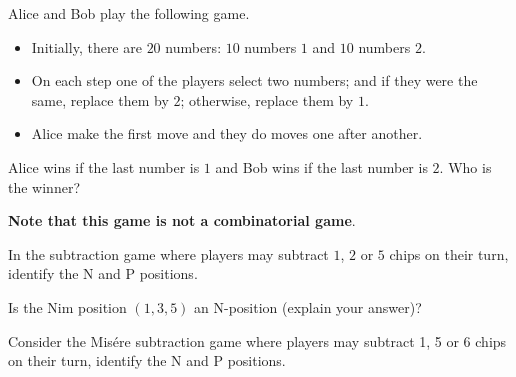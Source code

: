 \documentclass[addpoints,answers]{exam}
\begin{document}
    \pagestyle{headandfoot}
    \runningheadrule

    \firstpagefooter{}{}{}
    \runningfooter{}{}{}
    \begin{flushright}

        \vspace{0.2in}

    \end{flushright}

    \begin{questions}
        \question
            Alice and Bob play the following game.
            \begin{itemize}
                \item Initially, there are $20$ numbers: $10$ numbers $1$ and $10$ numbers
                    $2$.
                \item On each step one of the players select two numbers; and if they were
                    the same, replace them by $2$; otherwise, replace them by $1$.
                \item Alice make the first move and they do moves one after another.
            \end{itemize}
            Alice wins if the last number is $1$ and Bob wins if the last number is $2$.
            Who is the winner?
            
            \textbf{Note that this game is not a combinatorial game}.
            \begin{solutionorbox}[\stretch{1}]
            \end{solutionorbox}
            \newpage
        \question
            In the subtraction game where players may subtract $1$, $2$ or $5$ chips on
            their turn, identify the N and P positions.
            \begin{solutionorbox}[\stretch{1}]
            \end{solutionorbox}
            \newpage
        \question
            Is the Nim position $(1, 3, 5)$ an N-position (explain your answer)?
            \begin{solutionorbox}[\stretch{1}]
            \end{solutionorbox}
            \newpage
        \question
            Consider the Mis\'ere subtraction game where players may subtract 1, 5 or 6
            chips on their turn, identify the N and P positions.
            \begin{solutionorbox}[\stretch{1}]
            \end{solutionorbox}
            \newpage
\end{questions}
\end{document}
